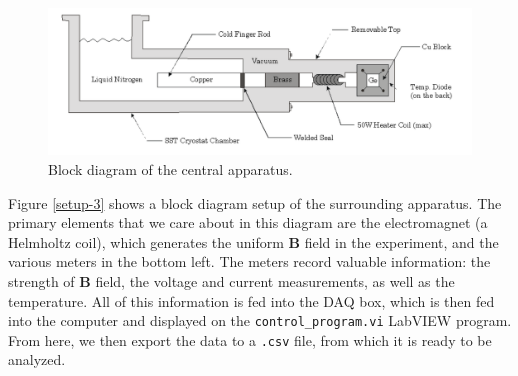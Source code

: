 \documentclass[10pt]{article}
\begin{document}
	\begin{figure}
		\centering
		\includegraphics[scale=0.5]{images/setup-1.png}
		\caption{Block diagram of the central apparatus.}
		\label{setup-1}
	\end{figure}

	Figure \ref{setup-3} shows a block diagram setup of the surrounding apparatus. The primary elements that
	we care about in this diagram are the electromagnet (a Helmholtz coil), which generates the uniform
	\( \mathbf{B} \) field in the experiment, and the various meters in the bottom left. The meters record
	valuable information: the strength of \( \mathbf{B} \) field, the voltage and current measurements, as
	well as the temperature. All of this information is fed into the DAQ box, which is then fed into the
	computer and displayed on the \texttt{control\_program.vi} LabVIEW program. From here, we then export
	the data to a \texttt{.csv} file, from which it is ready to be analyzed. 
\end{document}
